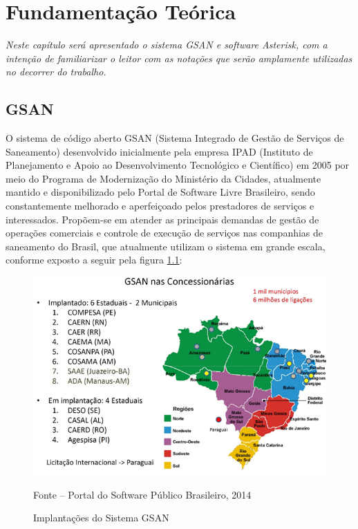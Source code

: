 \chapter[Fundamentação Teórica]{\textbf{F}undamentação \textbf{T}eórica}

\textit{Neste capítulo será apresentado o sistema GSAN e software Asterisk, com a intenção de familiarizar o leitor com as notações que serão amplamente utilizadas no decorrer do trabalho.}


\section{GSAN}
O sistema de código aberto GSAN (Sistema Integrado de Gestão de Serviços de Saneamento) desenvolvido inicialmente pela empresa IPAD (Instituto de Planejamento e Apoio ao Desenvolvimento Tecnológico e Científico) em 2005 por meio do Programa de Modernização do Ministério da Cidades, atualmente mantido e disponibilizado pelo Portal de Software Livre Brasileiro, sendo constantemente melhorado e aperfeiçoado pelos prestadores de serviços e interessados. Propõem-se em atender as principais demandas de gestão de operações comerciais e controle de execução de serviços nas companhias de saneamento do Brasil, que atualmente utilizam o sistema em grande escala, conforme exposto a seguir pela figura \ref{figura:implantacaoSistemaGSAN}:


\begin{figure}[!htb]
	\centering
	\includegraphics{figuras/implantacaoGSAN.png}
	\caption{Implantações do Sistema GSAN}	
	\label{figura:implantacaoSistemaGSAN}
	Fonte – Portal do Software Público Brasileiro, 2014
\end{figure}


